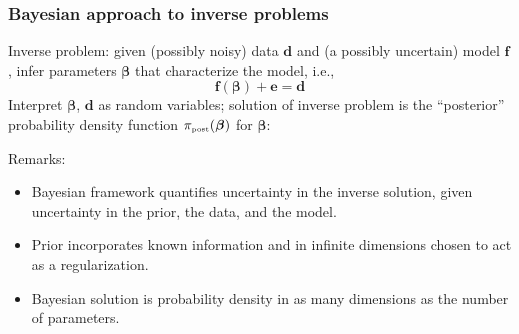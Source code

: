 \documentclass[10pt,final,xcolor=dvipsnames]{beamer}
\newcommand{\bs}[1]{\ensuremath{\boldsymbol{#1}}}
\newcommand{\xx}{\ensuremath{\boldsymbol x}}
\newcommand{\x}{\xx}
\begin{document}
\begin{frame}
  \frametitle{Bayesian approach to inverse problems} Inverse problem:
  given (possibly noisy) data $\bs d$ and (a possibly uncertain) model
  $\bs f$, infer parameters $\bs \beta$ that characterize the model, i.e.,
  \begin{equation*}
    \bs f(\bs \beta) + \bs e = \bs d
  \end{equation*}
  Interpret $\bs \beta$, $\bs d$ as random variables;
  solution of inverse problem is the ``posterior'' probability density function
  $\pi_{\mbox{\tiny post}}(\bs \beta)$ for
  $\bs \beta$:\\
  \begin{center}
  \end{center}
    \begin{block}{Remarks:}
      \begin{itemize}
      \item Bayesian framework quantifies uncertainty in the inverse
        solution, given uncertainty in the prior, the data, and the
        model.
      \item Prior incorporates known information and in infinite
        dimensions chosen to act as a regularization.
      \item Bayesian solution is probability density in as many dimensions as
        the number of parameters.
      \end{itemize}
    \end{block}
\end{frame}
\end{document}
